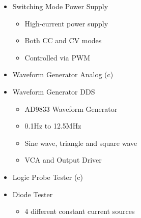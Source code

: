 \begin{itemize}
	\item Switching Mode Power Supply
	\begin{itemize}
		\item High-current power supply
		\item Both CC and CV modes
		\item Controlled via PWM
	\end{itemize}
	\item Waveform Generator Analog (c)
	\item Waveform Generator DDS
	\begin{itemize}
		\item AD9833 Waveform Generator
		\item 0.1Hz to 12.5MHz
		\item Sine wave, triangle and square wave
		\item VCA and Output Driver
	\end{itemize}
	\item Logic Probe Tester (c)
	\item Diode Tester
	\begin{itemize}
		\item 4 different constant current sources

\end{itemize}
\end{itemize}
